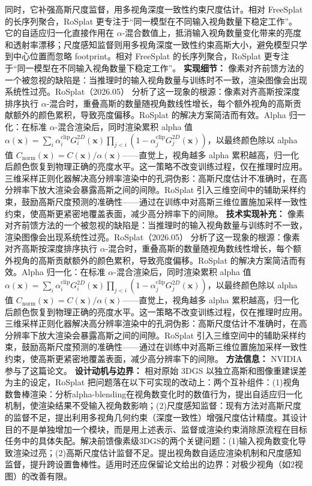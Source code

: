 同时，它补强高斯尺度监督，用多视角深度一致性约束尺度估计。相对 FreeSplat 的长序列聚合，RoSplat 更专注于“同一模型在不同输入视角数量下稳定工作”。
它的自适应归一化直接作用在 $\alpha$-混合数值上，抵消输入视角数量变化带来的亮度和透射率漂移；尺度感知监督则用多视角深度一致性约束高斯大小，避免模型只学到中心位置而忽略 footprint。相对 FreeSplat 的长序列聚合，RoSplat 更专注于“同一模型在不同输入视角数量下稳定工作”。
\textbf{实现细节：} 像素对齐前馈方法的一个被忽视的缺陷是：当推理时的输入视角数量与训练时不一致，渲染图像会出现系统性过亮。RoSplat（2026.05） 分析了这一现象的根源：像素对齐高斯按深度排序执行 $\alpha$-混合时，重叠高斯的数量随视角数线性增长，每个额外视角的高斯贡献额外的颜色累积，导致亮度偏移。RoSplat 的解决方案简洁而有效。Alpha 归一化：在标准 $\alpha$-混合渲染后，同时渲染累积 alpha 值 $\alpha(\mathbf{x}) = \sum_i \alpha_i^{\mathrm{clip}} G_i^{2D}(\mathbf{x}) \prod_{j<i}(1 - \alpha_j^{\mathrm{clip}} G_j^{2D}(\mathbf{x}))$，以最终颜色除以 alpha 值 $C_{\mathrm{norm}}(\mathbf{x}) = C(\mathbf{x}) / \alpha(\mathbf{x})$——直觉上，视角越多 alpha 累积越高，归一化后颜色恢复到物理正确的亮度水平。这一策略不改变训练过程，仅在推理时应用。三维采样正则化器解决高分辨率渲染中的孔洞伪影：高斯尺度估计不准确时，在高分辨率下放大渲染会暴露高斯之间的间隙。RoSplat 引入三维空间中的辅助采样约束，鼓励高斯尺度预测的准确性——通过在训练中对高斯三维位置施加采样一致性约束，使高斯更紧密地覆盖表面，减少高分辨率下的间隙。
\textbf{技术实现补充：} 像素对齐前馈方法的一个被忽视的缺陷是：当推理时的输入视角数量与训练时不一致，渲染图像会出现系统性过亮。RoSplat（2026.05） 分析了这一现象的根源：像素对齐高斯按深度排序执行 $\alpha$-混合时，重叠高斯的数量随视角数线性增长，每个额外视角的高斯贡献额外的颜色累积，导致亮度偏移。RoSplat 的解决方案简洁而有效。Alpha 归一化：在标准 $\alpha$-混合渲染后，同时渲染累积 alpha 值 $\alpha(\mathbf{x}) = \sum_i \alpha_i^{\mathrm{clip}} G_i^{2D}(\mathbf{x}) \prod_{j<i}(1 - \alpha_j^{\mathrm{clip}} G_j^{2D}(\mathbf{x}))$，以最终颜色除以 alpha 值 $C_{\mathrm{norm}}(\mathbf{x}) = C(\mathbf{x}) / \alpha(\mathbf{x})$——直觉上，视角越多 alpha 累积越高，归一化后颜色恢复到物理正确的亮度水平。这一策略不改变训练过程，仅在推理时应用。三维采样正则化器解决高分辨率渲染中的孔洞伪影：高斯尺度估计不准确时，在高分辨率下放大渲染会暴露高斯之间的间隙。RoSplat 引入三维空间中的辅助采样约束，鼓励高斯尺度预测的准确性——通过在训练中对高斯三维位置施加采样一致性约束，使高斯更紧密地覆盖表面，减少高分辨率下的间隙。
\textbf{方法信息：} NVIDIA 参与了这篇论文。
\textbf{设计动机与边界：} 相对原始 3DGS 以独立高斯和图像重建误差为主的设定，RoSplat 把问题落在以下可实现的改动上：两个互补组件：(1)视角数鲁棒渲染：分析alpha-blending在视角数变化时的数值行为，提出自适应归一化机制，使渲染结果不受输入视角数影响；(2)尺度感知监督：现有方法对高斯尺度的监督不足，提出利用多视角几何约束（深度一致性）增强尺度估计精度。其设计目的不是单独增加一个模块，而是用上述表示、监督或渲染约束消除原流程在目标任务中的具体失配。解决前馈像素级3DGS的两个关键问题：(1)输入视角数变化导致渲染过亮；(2)高斯尺度估计监督不足。提出视角数自适应渲染机制和尺度感知监督，提升跨设置鲁棒性。适用时还应保留论文给出的边界：对极少视角（如2视图）的改善有限。

